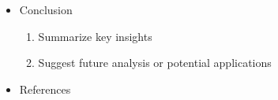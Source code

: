 \documentclass[12pt]{article}
\begin{document}
\begin{itemize}
\begin{enumerate}
\begin{enumerate}
            \end{enumerate}
            \item Inference for Numerical Data
        \begin{enumerate}
            \item Hypotheses
            \item Conditions of inference
            \item Test statistic and p-value
            \item Conclusion : Discuss results in context of the data
        \end{enumerate}
    \end{enumerate}
    \item Conclusion
    \begin{enumerate}
            \item Summarize key insights
            \item Suggest future analysis or potential applications
        \end{enumerate}
    \item References
\end{itemize}
\end{document}
